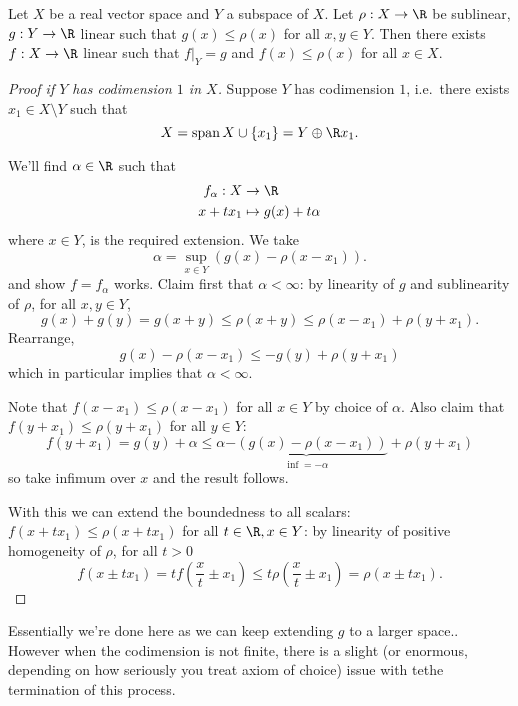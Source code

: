 \documentclass[a4paper]{article}
\DeclareMathOperator{\spans}{span} %
\begin{document}
\begin{theorem}
  \label{thm:Hahn-Banach}
  Let \(X\) be a real vector space and \(Y\) a subspace of \(X\). Let \(\rho: X \to \R\) be sublinear, \(g: Y \to \R\) linear such that \(g(x) \leq \rho(x)\) for all \(x, y \in Y\). Then there exists \(f: X \to \R\) linear such that \(f|_Y = g\) and \(f(x) \leq \rho(x)\) for all \(x \in X\).
\end{theorem}

\begin{proof}[Proof if \(Y\) has codimension \(1\) in \(X\)]
  Suppose \(Y\) has codimension \(1\), i.e.\ there exists \(x_1 \in X \setminus Y\) such that
  \[
    X = \spans X \cup \{x_1\} = Y \oplus \R x_1.
  \]

  We'll find \(\alpha \in \R\) such that
  \begin{align*}
    f_\alpha: X &\to \R \\
    x + tx_1 &\mapsto g(x) + t \alpha
  \end{align*}
  where \(x \in Y\), is the required extension. We take
  \[
    \alpha = \sup_{x \in Y} (g(x) - \rho(x - x_1)).
  \]
  and show \(f = f_\alpha\) works. Claim first that \(\alpha < \infty\): by linearity of \(g\) and sublinearity of \(\rho\), for all \(x, y \in Y\),
  \[
    g(x) + g(y) = g(x + y) \leq \rho(x + y) \leq \rho(x - x_1) + \rho(y + x_1).
  \]
  Rearrange,
  \[
    g(x) - \rho(x - x_1) \leq - g(y) + \rho(y + x_1)
  \]
  which in particular implies that \(\alpha < \infty\).

  Note that \(f(x - x_1) \leq \rho(x - x_1)\) for all \(x \in Y\) by choice of \(\alpha\). Also claim that \(f(y + x_1) \leq \rho(y + x_1)\) for all \(y \in Y\):
  \[
    f(y + x_1) = g(y) + \alpha \leq \alpha \underbrace{-(g(x) - \rho(x - x_1))}_{\inf = -\alpha} + \rho(y + x_1)
  \]
  so take infimum over \(x\) and the result follows.

  With this we can extend the boundedness to all scalars: \(f(x + tx_1) \leq \rho(x + tx_1)\) for all \(t \in \R, x \in Y\): by linearity of positive homogeneity of \(\rho\), for all \(t > 0\)
  \[
    f(x \pm tx_1) = tf(\frac{x}{t} \pm x_1) \leq t \rho( \frac{x}{t} \pm x_1) = \rho(x \pm tx_1).
  \]
\end{proof}

Essentially we're done here as we can keep extending \(g\) to a larger space.. However when the codimension is not finite, there is a slight (or enormous, depending on how seriously you treat axiom of choice) issue with tethe termination of this process.
\end{document}
